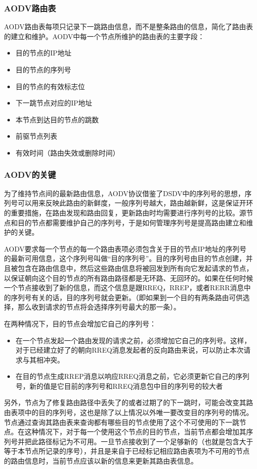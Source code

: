 \documentclass[12pt,a4paper]{article}
\begin{document}
\subsubsection{AODV路由表}
AODV路由表每项只记录下一跳路由信息，而不是整条路由的信息，简化了路由表的建立和维护。AODV中每一个节点所维护的路由表的主要字段：
\begin{itemize}
	\item 目的节点的IP地址
	\item 目的节点的序列号
	\item 目的节点的有效标志位
	\item 下一跳节点对应的IP地址
	\item 本节点到达目的节点的跳数
	\item 前驱节点列表
	\item 有效时间（路由失效或删除时间）
\end{itemize}

\subsubsection{AODV的关键}
为了维持节点间的最新路由信息，AODV协议借鉴了DSDV中的序列号的思想，序列号可以用来反映此路由的新鲜度，一般序列号越大，路由越新鲜，这是保证开环的重要措施，在路由发现和路由回复，更新路由时均需要进行序列号的比较。源节点和目的节点都需要维护自己的序列号，于是如何管理序列号是提高路由建立和维护的关键。

AODV要求每一个节点的每一个路由表项必须包含关于目的节点IP地址的序列号的最新可用信息，这个序列号叫做“目的序列号”。目的序列号由目的节点创建，并且被包含在路由信息中，然后这些路由信息将被回发到所有向它发起请求的节点，以保证朝向这个目的节点的所有路由路径都是无环路、无回环的。如果在任何时候一个节点接收到了新的信息，而这个信息是跟RREQ，RREP，或者RERR消息中的序列号有关的话，目的序列号就会更新。（即如果到一个目的有两条路由可供选择，那么收到请求的节点将会选择序列号最大的那一条）。

在两种情况下，目的节点会增加它自己的序列号：
\begin{itemize}
	\item 在一个节点发起一个路由发现的请求之前，必须增加它自己的序列号。这样，对于已经建立好了的朝向RREQ消息发起者的反向路由来说，可以防止本次请求与其相冲突。
	\item 在目的节点生成RREP消息以响应RREQ消息之前，它必须更新它自己的序列号，新的值是它目前的序列号和RREQ消息包中目的序列号的较大者
\end{itemize}

另外，节点为了修复路由路径中丢失了的或者过期了的下一跳时，可能会改变其路由表项中的目的序列号，这也是除了以上情况以外唯一要改变目的序列号的情况。节点通过查询其路由表来查询都有哪些目的节点使用了这个不可使用的下一跳节点。在这种情况下，对于每一个使用这个节点的目的节点，当前节点都会增加其序列号并把此路径标记为不可用。一旦节点接收到了一个足够新的（也就是包含大于等于本节点所记录的序号），并且是来自于已经标记相应路由表项为不可用的节点的路由信息时，当前节点应该以新的信息来更新其路由表信息。
\end{document}
